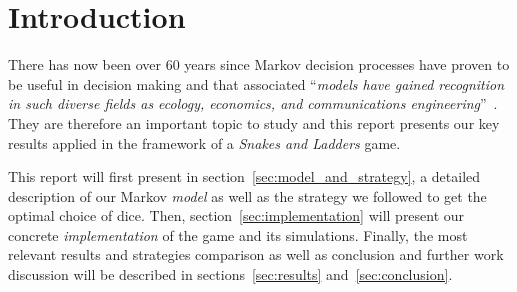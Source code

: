 \section{Introduction} %
\label{sec:introduction}
There has now been over 60 years since Markov decision processes have proven to
be useful in decision making and that associated \enquote{\textit{models have 
gained recognition in such diverse fields as ecology, economics,
and communications engineering}}~\cite{puterman2014markov}.
They are therefore an important topic to study and this report presents
our key results applied in the framework of a \emph{Snakes and Ladders} game.

This report will first present in section~\ref{sec:model_and_strategy},
a detailed description of our Markov \emph{model}
as well as the strategy we followed to get the optimal choice of dice.
Then, section~\ref{sec:implementation} will present our concrete \emph{implementation}
of the game and its simulations.
Finally, the most relevant results and strategies comparison as well as
conclusion and further work discussion will be described in sections~\ref{sec:results}
and~\ref{sec:conclusion}.

